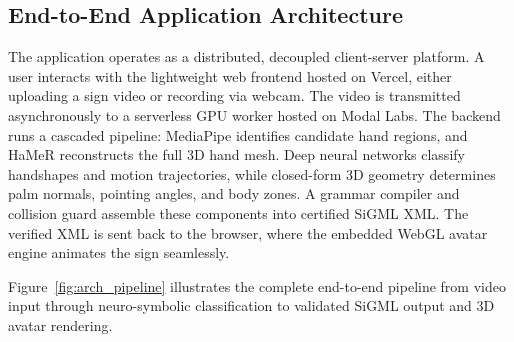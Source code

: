 \documentclass[11pt, a4paper]{article}
\begin{document}
\subsection{End-to-End Application Architecture}
\noindent
The application operates as a distributed, decoupled client-server platform. A user interacts with the lightweight web frontend hosted on Vercel, either uploading a sign video or recording via webcam. The video is transmitted asynchronously to a serverless GPU worker hosted on Modal Labs. The backend runs a cascaded pipeline: MediaPipe identifies candidate hand regions, and HaMeR reconstructs the full 3D hand mesh. Deep neural networks classify handshapes and motion trajectories, while closed-form 3D geometry determines palm normals, pointing angles, and body zones. A grammar compiler and collision guard assemble these components into certified SiGML XML. The verified XML is sent back to the browser, where the embedded WebGL avatar engine animates the sign seamlessly.

\vspace{0.3cm}
\noindent
Figure~\ref{fig:arch_pipeline} illustrates the complete end-to-end pipeline from video input through neuro-symbolic classification to validated SiGML output and 3D avatar rendering.
\end{document}
